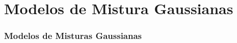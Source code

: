 \section{Modelos de Mistura Gaussianas}
\label{sec:gmm}

\contentscurrent

\begin{frame}
\frametitle{Modelos de Misturas Gaussianas}
\end{frame}